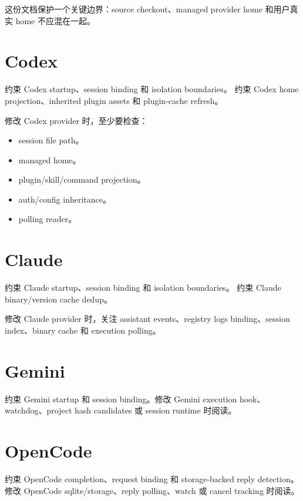 这份文档保护一个关键边界：source checkout、managed provider home 和用户真实 home 不应混在一起。

\section{Codex}

 约束 Codex startup、session binding 和 isolation boundaries。 约束 Codex home projection、inherited plugin assets 和 plugin-cache refresh。

修改 Codex provider 时，至少要检查：

\begin{itemize}
  \item session file path。
  \item managed home。
  \item plugin/skill/command projection。
  \item auth/config inheritance。
  \item polling reader。
\end{itemize}

\section{Claude}

 约束 Claude startup、session binding 和 isolation boundaries。 约束 Claude binary/version cache dedup。

修改 Claude provider 时，关注 assistant events、registry logs binding、session index、binary cache 和 execution polling。

\section{Gemini}

 约束 Gemini startup 和 session binding。修改 Gemini execution hook、watchdog、project hash candidates 或 session runtime 时阅读。

\section{OpenCode}

 约束 OpenCode completion、request binding 和 storage-backed reply detection。修改 OpenCode sqlite/storage、reply polling、watch 或 cancel tracking 时阅读。

